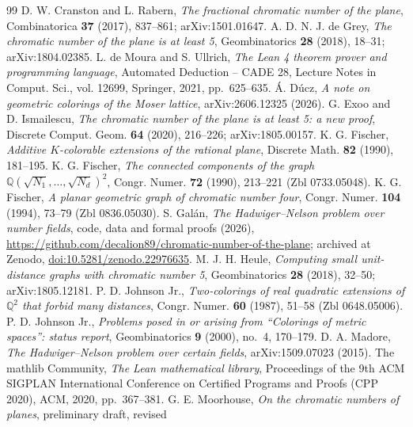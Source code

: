 \documentclass[11pt,a4paper]{amsart}
\theoremstyle{remark}
\newcommand{\Q}{\mathbb{Q}}
\begin{document}
\begin{thebibliography}{99}
 D. W. Cranston and L. Rabern, \emph{The fractional chromatic number of the plane},
Combinatorica \textbf{37} (2017), 837--861; arXiv:1501.01647.
 A. D. N. J. de Grey, \emph{The chromatic number of the plane is at least 5}, Geombinatorics
\textbf{28} (2018), 18--31; arXiv:1804.02385.
 L. de Moura and S. Ullrich, \emph{The Lean 4 theorem prover and programming language},
Automated Deduction -- CADE 28, Lecture Notes in Comput. Sci., vol. 12699, Springer, 2021, pp.~625--635.
 \'A. D\'ucz, \emph{A note on geometric colorings of the Moser lattice}, arXiv:2606.12325 (2026).
 G. Exoo and D. Ismailescu, \emph{The chromatic number of the plane is at least 5: a new
proof}, Discrete Comput. Geom. \textbf{64} (2020), 216--226; arXiv:1805.00157.
 K. G. Fischer, \emph{Additive $K$-colorable extensions of the rational plane}, Discrete
Math. \textbf{82} (1990), 181--195.
 K. G. Fischer, \emph{The connected components of the graph
$\Q(\sqrt{N_1},\dots,\sqrt{N_d})^2$}, Congr. Numer. \textbf{72} (1990), 213--221 (Zbl 0733.05048).
 K. G. Fischer, \emph{A planar geometric graph of chromatic number four}, Congr. Numer.
\textbf{104} (1994), 73--79 (Zbl 0836.05030).
 S. Gal\'an, \emph{The Hadwiger--Nelson problem over number fields}, code, data and formal
proofs (2026), \url{https://github.com/decalion89/chromatic-number-of-the-plane}; archived at Zenodo,
\href{https://doi.org/10.5281/zenodo.22976635}{doi:10.5281/zenodo.22976635}.
 M. J. H. Heule, \emph{Computing small unit-distance graphs with chromatic number 5},
Geombinatorics \textbf{28} (2018), 32--50; arXiv:1805.12181.
 P. D. Johnson Jr., \emph{Two-colorings of real quadratic extensions of $\Q^2$ that forbid
many distances}, Congr. Numer. \textbf{60} (1987), 51--58 (Zbl 0648.05006).
 P. D. Johnson Jr., \emph{Problems posed in or arising from ``Colorings of metric spaces'':
status report}, Geombinatorics \textbf{9} (2000), no.~4, 170--179.
 D. A. Madore, \emph{The Hadwiger--Nelson problem over certain fields}, arXiv:1509.07023 (2015).
 The mathlib Community, \emph{The Lean mathematical library}, Proceedings of the 9th ACM
SIGPLAN International Conference on Certified Programs and Proofs (CPP 2020), ACM, 2020, pp.~367--381.
 G. E. Moorhouse, \emph{On the chromatic numbers of planes}, preliminary draft, revised

\end{thebibliography}
\end{document}
